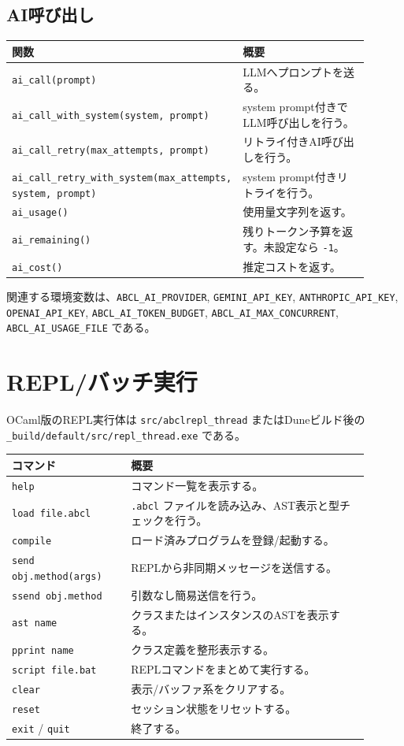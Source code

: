 \documentclass[11pt,a4paper,uplatex,dvipdfmx]{jsarticle}
\begin{document}
\subsection{AI呼び出し}

\begin{longtable}{p{0.42\linewidth}p{0.48\linewidth}}
\toprule
関数 & 概要 \\
\midrule
\texttt{ai\_call(prompt)} & LLMへプロンプトを送る。 \\
\texttt{ai\_call\_with\_system(system, prompt)} & system prompt付きでLLM呼び出しを行う。 \\
\texttt{ai\_call\_retry(max\_attempts, prompt)} & リトライ付きAI呼び出しを行う。 \\
\texttt{ai\_call\_retry\_with\_system(max\_attempts, system, prompt)} & system prompt付きリトライを行う。 \\
\texttt{ai\_usage()} & 使用量文字列を返す。 \\
\texttt{ai\_remaining()} & 残りトークン予算を返す。未設定なら \texttt{-1}。 \\
\texttt{ai\_cost()} & 推定コストを返す。 \\
\bottomrule
\end{longtable}

関連する環境変数は、\texttt{ABCL\_AI\_PROVIDER},
\texttt{GEMINI\_API\_KEY}, \texttt{ANTHROPIC\_API\_KEY},
\texttt{OPENAI\_API\_KEY}, \texttt{ABCL\_AI\_TOKEN\_BUDGET},
\texttt{ABCL\_AI\_MAX\_CONCURRENT}, \texttt{ABCL\_AI\_USAGE\_FILE} である。

\section{REPL/バッチ実行}

OCaml版のREPL実行体は \texttt{src/abclrepl\_thread} またはDuneビルド後の
\texttt{\_build/default/src/repl\_thread.exe} である。

\begin{longtable}{p{0.30\linewidth}p{0.60\linewidth}}
\toprule
コマンド & 概要 \\
\midrule
\texttt{help} & コマンド一覧を表示する。 \\
\texttt{load file.abcl} & \texttt{.abcl} ファイルを読み込み、AST表示と型チェックを行う。 \\
\texttt{compile} & ロード済みプログラムを登録/起動する。 \\
\texttt{send obj.method(args)} & REPLから非同期メッセージを送信する。 \\
\texttt{ssend obj.method} & 引数なし簡易送信を行う。 \\
\texttt{ast name} & クラスまたはインスタンスのASTを表示する。 \\
\texttt{pprint name} & クラス定義を整形表示する。 \\
\texttt{script file.bat} & REPLコマンドをまとめて実行する。 \\
\texttt{clear} & 表示/バッファ系をクリアする。 \\
\texttt{reset} & セッション状態をリセットする。 \\
\texttt{exit} / \texttt{quit} & 終了する。 \\
\bottomrule
\end{longtable}
\end{document}
